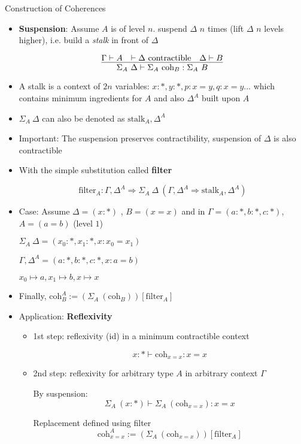 \documentclass[12pt, mathserif,handout]{beamer}
\begin{document}
\begin{frame}[allowframebreaks,c]{Construction of Coherences}
\begin{itemize}
\item \textbf{Suspension}: Assume $A$ is of level $n$. suspend $\Delta$ $n$ times (lift $\Delta$ $n$ levels higher), i.e. build a \emph{stalk} in front of $\Delta$

\begin{equation*}
\infer{\Sigma_A ~ \Delta \vdash \Sigma_A ~\text{coh}_B : \Sigma_A ~ B}
{\Gamma \vdash A &  \vdash \Delta ~\text{contractible} & \Delta \vdash B} 
\end{equation*}

\item A stalk is a context of $2n$ variables: $x : *, y : *, p : x= y, q : x= y...$ which contains minimum ingredients
for $A$ and also $\Delta^{A}$ built upon $A$

\item $\Sigma_A ~ \Delta$ can also be denoted as $\text{stalk}_A, \Delta^{A} $

\framebreak


\item Important: The suspension preserves contractibility, suspension of $\Delta$ is also contractible
 

\item With the simple substitution called \textbf{filter}

$$\text{filter}_A : \Gamma, \Delta^{A} \Rightarrow \Sigma_A ~ \Delta ~(\Gamma, \Delta^{A} \Rightarrow \text{stalk}_A, \Delta^{A} )$$

\item Case: Assume $\Delta = (x : *)$ , $B = (x = x)$
and in $\Gamma = (a : *, b : *, c : *)$, $A = (a = b)$ (level $1$)

$\Sigma_{A} ~ \Delta = (x_0 : *, x_1 : *, x : x_0 = x_1)$

$\Gamma, \Delta^{A} = (a : *, b : *, c : *, x : a = b)$

$x_0 \mapsto a , x_1 \mapsto b , x \mapsto x$

\item Finally,  $\text{coh}_{B}^{A} := (\Sigma_A ~(\text{coh}_{B})) [ \text{filter}_A ]$ 

\framebreak

\item Application: \textbf{Reflexivity}

\begin{itemize}

\item 1st step: reflexivity (id) in a minimum contractible context

$$x : * \vdash \text{coh}_{x=x} : x = x$$

\item 2nd step: reflexivity for arbitrary type $A$ in arbitrary
  context $\Gamma$

By suspension: $$\Sigma_A ~(x:*) \vdash \Sigma_A ~(\text{coh}_{x=x}) : x = x$$

Replacement defined using filter $$ \text{coh}_{x=x}^{A} := (\Sigma_A ~(\text{coh}_{x=x})) [ \text{filter}_A ]$$ 
\end{itemize}

\end{itemize}
\end{frame}
\end{document}
